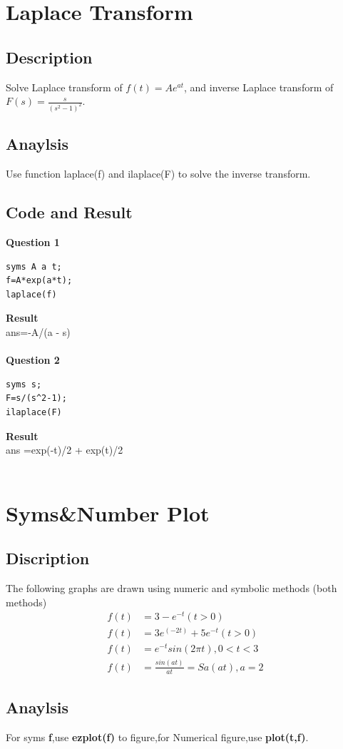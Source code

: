 \documentclass[UTF8,a4paper]{article}
\begin{document}
\section{Laplace Transform}
\subsection{Description}
Solve Laplace transform of $f(t)=Ae^{at}$, and inverse Laplace transform of $F(s)=\frac{s}{(s^2-1)^2}$.
\subsection{Anaylsis}
\noindent Use function laplace(f) and ilaplace(F) to solve the inverse transform.
\subsection{Code and Result}
\textbf{Question 1}\\
\begin{lstlisting}
syms A a t;
f=A*exp(a*t);
laplace(f)
\end{lstlisting}
\textbf{Result}\\
ans=-A/(a - s)\\\\
\textbf{Question 2}\\
\begin{lstlisting}
syms s;
F=s/(s^2-1);
ilaplace(F)
\end{lstlisting}
\textbf{Result}\\
ans =exp(-t)/2 + exp(t)/2\\\\
\section{Syms\&Number Plot}
\subsection{Discription}
The following graphs are drawn using numeric and symbolic methods (both methods)
$$
\begin{aligned}
    f(t)&=3-e^{-t}(t>0)\\
    f(t)&=3e^(-2t)+5e^{-t}(t>0)\\
    f(t)&=e^{-t}sin(2\pi t),0<t<3\\
    f(t)&=\frac{sin(at)}{at}=Sa(at),a=2
\end{aligned}
$$
\subsection{Anaylsis}
For syms \textbf{f},use \textbf{ezplot(f)} to figure,for Numerical figure,use \textbf{plot(t,f)}.
\end{document}

